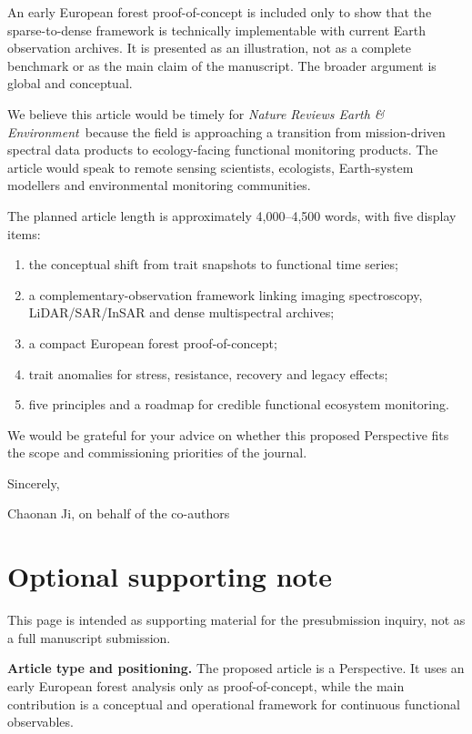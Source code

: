 \documentclass[11pt]{article}
\newcommand{\journal}{\textit{Nature Reviews Earth \& Environment}}
\begin{document}
An early European forest proof-of-concept is included only to show that the sparse-to-dense framework is technically implementable with current Earth observation archives. It is presented as an illustration, not as a complete benchmark or as the main claim of the manuscript. The broader argument is global and conceptual.

We believe this article would be timely for \journal\ because the field is approaching a transition from mission-driven spectral data products to ecology-facing functional monitoring products. The article would speak to remote sensing scientists, ecologists, Earth-system modellers and environmental monitoring communities.

The planned article length is approximately 4,000--4,500 words, with five display items:

\begin{enumerate}
\item the conceptual shift from trait snapshots to functional time series;
\item a complementary-observation framework linking imaging spectroscopy, LiDAR/SAR/InSAR and dense multispectral archives;
\item a compact European forest proof-of-concept;
\item trait anomalies for stress, resistance, recovery and legacy effects;
\item five principles and a roadmap for credible functional ecosystem monitoring.
\end{enumerate}

We would be grateful for your advice on whether this proposed Perspective fits the scope and commissioning priorities of the journal.

Sincerely,

Chaonan Ji, on behalf of the co-authors

\clearpage
\section*{Optional supporting note}

This page is intended as supporting material for the presubmission inquiry, not as a full manuscript submission.

\textbf{Article type and positioning.}
The proposed article is a Perspective. It uses an early European forest analysis only as proof-of-concept, while the main contribution is a conceptual and operational framework for continuous functional observables.
\end{document}
